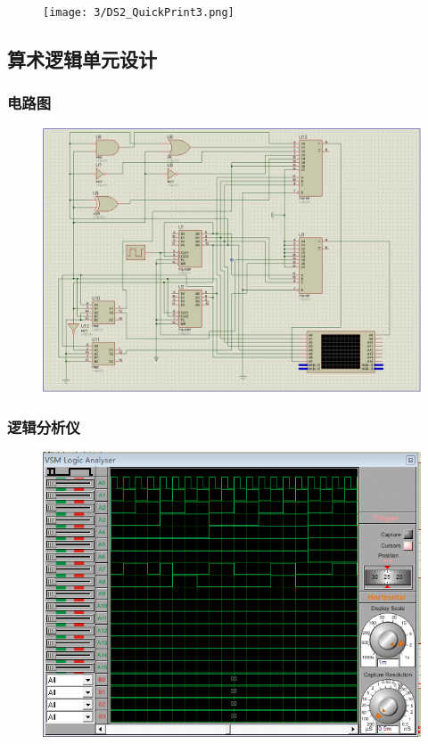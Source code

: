 \documentclass{article}
\begin{document}
\begin{figure}[!hbp]
  \centering
  \texttt{[image: 3/DS2\_QuickPrint3.png]}
\end{figure}

\newpage

\subsection{算术逻辑单元设计}

\subsubsection{电路图}

\begin{figure}[!hbp]
  \centering
  \includegraphics[scale=0.3]{4/1.png}
\end{figure}

\subsubsection{逻辑分析仪}

\begin{figure}[!hbp]
  \centering
  \includegraphics[scale=0.5]{4/2.png}
\end{figure}
\end{document}
